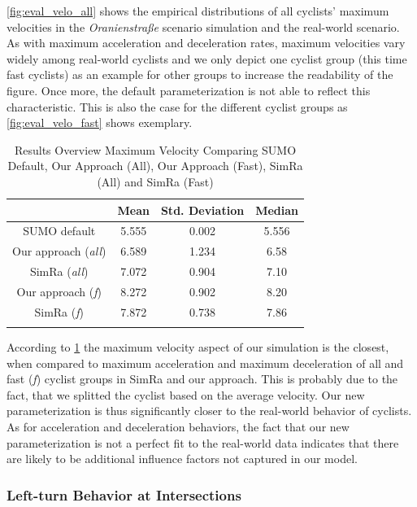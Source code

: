 \cref{fig:eval_velo_all} shows the empirical distributions of all cyclists' maximum velocities in the \textit{Oranienstraße} scenario simulation and the real-world scenario.
As with maximum acceleration and deceleration rates, maximum velocities vary widely among real-world cyclists and we only depict one cyclist group (this time fast cyclists) as an example for other groups to increase the readability of the figure.
Once more, the default parameterization is not able to reflect this characteristic.
This is also the case for the different cyclist groups as \cref{fig:eval_velo_fast} shows exemplary.
\begin{table}
\centering
\caption{Results Overview Maximum Velocity Comparing SUMO Default, Our Approach (All), Our Approach (Fast), SimRa (All) and SimRa (Fast)}%
\label{tab:results_overview_vel}
\begin{tabular}{cccc}
\toprule
& Mean & Std. Deviation & Median\\
\midrule
\midrule
SUMO default & \num{5.555} & \num{0.002} & \num{5.556} \\
\midrule
Our approach (\textit{all}) & \num{6.589} & \num{1.234} & \num{6.58} \\
SimRa (\textit{all}) & \num{7.072} & \num{0.904} & \num{7.10} \\
\midrule
Our approach (\textit{f}) & \num{8.272} & \num{0.902} & \num{8.20} \\
SimRa (\textit{f}) & \num{7.872} & \num{0.738} & \num{7.86} \\
\bottomrule&
\end{tabular}
\end{table}
According to \cref{tab:results_overview_vel} the maximum velocity aspect of our simulation is the closest, when compared to maximum acceleration and maximum deceleration of all and fast (\textit{f}) cyclist groups in SimRa and our approach.
This is probably due to the fact, that we splitted the cyclist based on the average velocity.
Our new parameterization is thus significantly closer to the real-world behavior of cyclists.
As for acceleration and deceleration behaviors, the fact that our new parameterization is not a perfect fit to the real-world data indicates that there are likely to be additional influence factors not captured in our model.

\subsubsection{Left-turn Behavior at Intersections}
\label{subsubsec:left-turn_behavior_at_intersections_evaluation}

